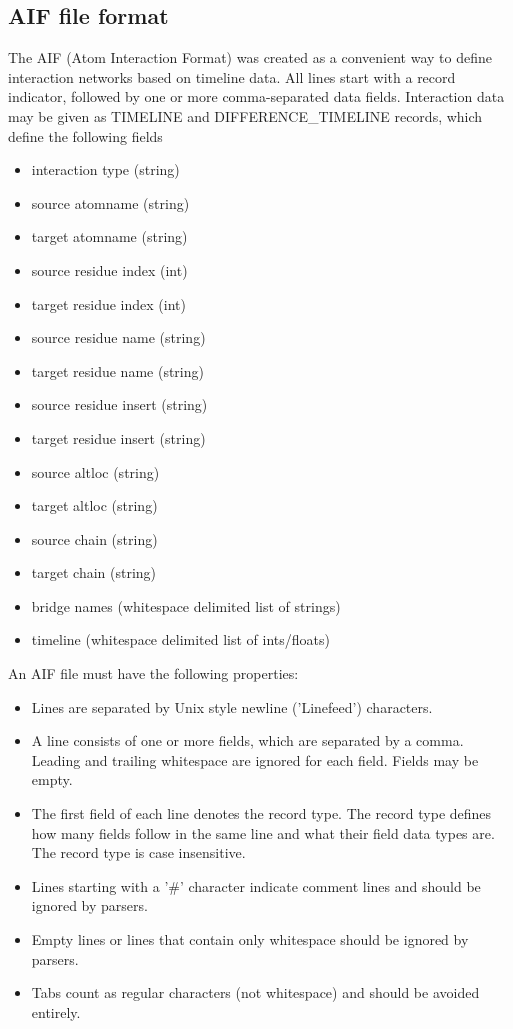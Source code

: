 \subsection{AIF file format}
\label{sec:file_formats}
The AIF (Atom Interaction Format) was created as a convenient way to define interaction networks based on timeline data. All lines start with a record indicator, followed by one or more comma-separated data fields. Interaction data may be given as TIMELINE and DIFFERENCE\_TIMELINE records, which define the following fields

\begin{itemize}
\item interaction type (string)
\item source atomname (string)
\item target atomname (string)
\item source residue index (int)
\item target residue index (int)
\item source residue name (string)
\item target residue name (string)
\item source residue insert (string)
\item target residue insert (string)
\item source altloc (string)
\item target altloc (string)
\item source chain (string)
\item target chain (string)
\item bridge names (whitespace delimited list of strings)
\item timeline (whitespace delimited list of ints/floats)
\end{itemize}

An AIF file must have the following properties:

\begin{itemize}
\item Lines are separated by Unix style newline ('Linefeed') characters.
\item A line consists of one or more fields, which are separated by a comma. Leading and trailing whitespace are ignored for each field. Fields may be empty.
\item The first field of each line denotes the record type. The record type defines how many fields follow in the same line and what their field data types are. The record type is case insensitive.
\item Lines starting with a '\#' character indicate comment lines and should be ignored by parsers.
\item Empty lines or lines that contain only whitespace should be ignored by parsers.
\item Tabs count as regular characters (not whitespace) and should be avoided entirely.
\end{itemize}

